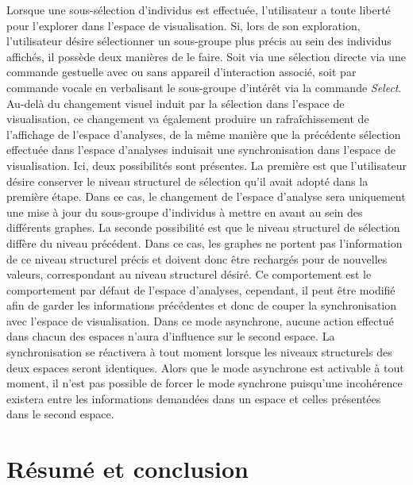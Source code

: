 Lorsque une sous-sélection d'individus est effectuée, l'utilisateur a toute liberté pour l'explorer dans l'espace de visualisation. Si, lors de son exploration, l'utilisateur désire sélectionner un sous-groupe plus précis au sein des individus affichés, il possède deux manières de le faire. Soit via une sélection directe via une commande gestuelle avec ou sans appareil d'interaction associé, soit par commande vocale en verbalisant le sous-groupe d’intérêt via la commande \textit{Select}.
Au-delà du changement visuel induit par la sélection dans l'espace de visualisation, ce changement va également produire un rafraîchissement de l'affichage de l'espace d'analyses, de la même manière que la précédente sélection effectuée dans l'espace d'analyses induisait une synchronisation dans l'espace de visualisation. Ici, deux possibilités sont présentes. La première est que l’utilisateur désire conserver le niveau structurel de sélection qu'il avait adopté dans la première étape. Dans ce cas, le changement de l'espace d'analyse sera uniquement une mise à jour du sous-groupe d'individus à mettre en avant au sein des différents graphes. La seconde possibilité est que le niveau structurel de sélection diffère du niveau précédent. Dans ce cas, les graphes ne portent pas l'information de ce niveau structurel précis et doivent donc être rechargés pour de nouvelles valeurs, correspondant au niveau structurel désiré. Ce comportement est le comportement par défaut de l'espace d'analyses, cependant, il peut être modifié afin de garder les informations précédentes et donc de couper la synchronisation avec l'espace de visualisation. Dans ce mode asynchrone, aucune action effectué dans chacun des espaces n'aura d'influence sur le second espace. La synchronisation se réactivera à tout moment lorsque les niveaux structurels des deux espaces seront identiques.
Alors que le mode asynchrone est activable à tout moment, il n'est pas possible de forcer le mode synchrone puisqu'une incohérence existera entre les informations demandées dans un espace et celles présentées dans le second espace.

\section{Résumé et conclusion}
\label{sec:ConclusionVisuAna}

